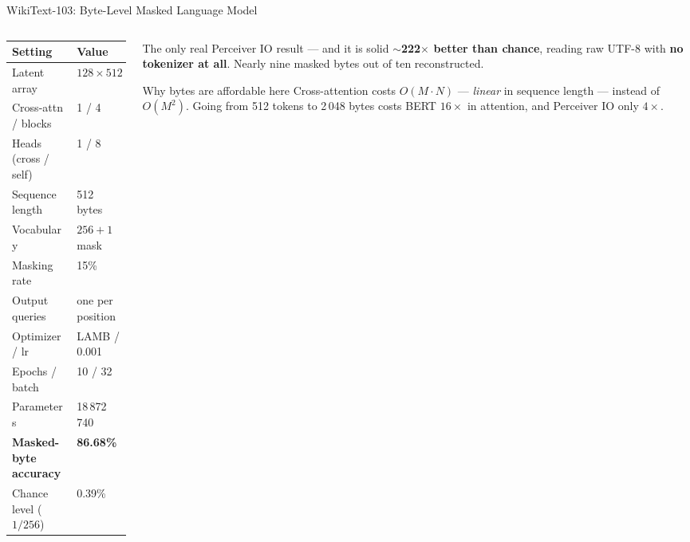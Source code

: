 \documentclass[aspectratio=169,11pt]{beamer}
\begin{document}
\begin{frame}[shrink=5]{WikiText-103: Byte-Level Masked Language Model}
  \begin{columns}[T]
    \begin{column}{0.46\textwidth}
      \begin{table}
        \centering\small
        \begin{tabular}{ll}
          \toprule
          \textbf{Setting} & \textbf{Value} \\
          \midrule
          Latent array & $128 \times 512$ \\
          Cross-attn / blocks & 1 / 4 \\
          Heads (cross / self) & 1 / 8 \\
          Sequence length & 512 bytes \\
          Vocabulary & $256 + 1$ mask \\
          Masking rate & 15\% \\
          Output queries & one per position \\
          Optimizer / lr & LAMB / 0.001 \\
          Epochs / batch & 10 / 32 \\
          Parameters & 18\,872\,740 \\
          \midrule
          \textbf{Masked-byte accuracy} & \textbf{86.68\%} \\
          Chance level ($1/256$) & 0.39\% \\
          \bottomrule
        \end{tabular}
      \end{table}
    \end{column}
    \begin{column}{0.50\textwidth}
      \begin{block}{The only real Perceiver IO result --- and it is solid}
        \small
        \textbf{$\sim$222$\times$ better than chance}, reading raw UTF-8 with \textbf{no tokenizer at all}. Nearly nine masked bytes out of ten reconstructed.
      \end{block}

      \vspace{0.3em}
      \begin{block}{Why bytes are affordable here}
        \small
        Cross-attention costs $O(M \cdot N)$ --- \emph{linear} in sequence length --- instead of $O(M^2)$. Going from 512 tokens to 2\,048 bytes costs BERT $16\times$ in attention, and Perceiver IO only $4\times$.
      \end{block}


\end{column}
\end{columns}
\end{frame}
\end{document}

